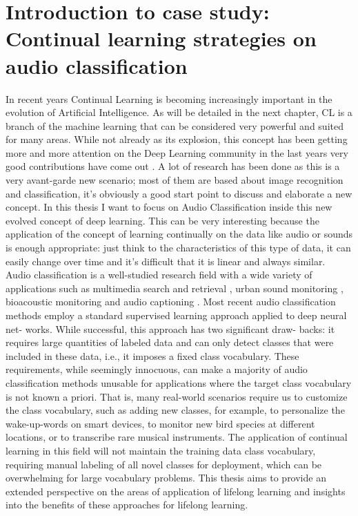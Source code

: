 \documentclass[english, LaM, oneside]{sapthesis}%
\begin{document}
\section{Introduction to case study: Continual learning strategies on audio classification}
In recent years Continual Learning is becoming increasingly important in the evolution of Artificial Intelligence. As will be detailed in the next chapter, CL is a branch of the machine learning that can be considered very powerful and suited for many areas. While not already as its explosion, this concept has been getting more and more attention on the Deep Learning community in the last years very good contributions have come out \cite{hoiem, Kirkpatrick}.
A lot of research has been done as this is a very avant-garde new scenario; most of them are based about image recognition and classification, it’s obviously a good start point to discuss and elaborate a new concept.
\newline \newline
In this thesis I want to focus on Audio Classification inside this new evolved concept of deep learning. This can be very interesting because the application of the concept of learning continually on the data like audio or sounds is enough appropriate: just think to the characteristics of this type of data, it can easily change over time and it’s difficult that it is linear and always similar.
Audio classification is a well-studied research field \cite{zhang} with a wide variety of applications such as multimedia search and retrieval \cite {gemmeke}, urban sound monitoring \cite{bello}, bioacoustic monitoring \cite{salamon} and audio captioning \cite{drossos}. Most recent audio classification methods employ a standard supervised learning approach applied to deep neural net- works. While successful, this approach has two significant draw- backs: it requires large quantities of labeled data and can only detect classes that were included in these data, i.e., it imposes a fixed class vocabulary. These requirements, while seemingly innocuous, can make a majority of audio classification methods unusable for applications where the target class vocabulary is not known a priori. That is, many real-world scenarios require us to customize the class vocabulary, such as adding new classes, for example, to personalize the wake-up-words on smart devices, to monitor new bird species at different locations, or to transcribe rare musical instruments.
\newline \newline
The application of continual learning in this field will not maintain the training data class vocabulary, requiring manual labeling of all novel classes for deployment, which can be overwhelming for large vocabulary problems.
This thesis aims to provide an extended perspective on the areas of application of lifelong learning and insights into the benefits of these approaches for lifelong learning.
\end{document}
